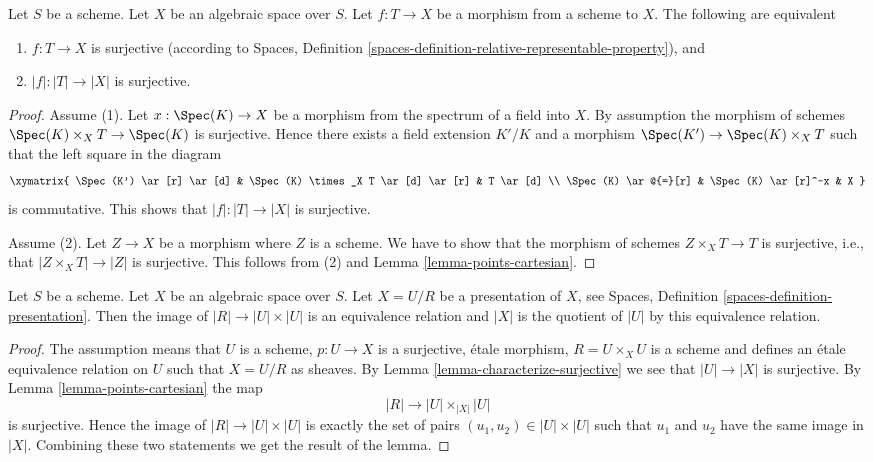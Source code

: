 \begin{lemma}
\label{lemma-characterize-surjective}
Let $S$ be a scheme.
Let $X$ be an algebraic space over $S$.
Let $f : T \to X$ be a morphism from a scheme to $X$.
The following are equivalent
\begin{enumerate}
\item $f : T \to X$ is surjective (according to
Spaces, Definition \ref{spaces-definition-relative-representable-property}),
and
\item $|f| : |T| \to |X|$ is surjective.
\end{enumerate}
\end{lemma}

\begin{proof}
Assume (1). Let $x : \Spec(K) \to X$ be a morphism
from the spectrum of a field into $X$. By assumption the morphism of
schemes $\Spec(K) \times_X T \to \Spec(K)$ is surjective.
Hence there exists a field extension $K'/K$ and a morphism
$\Spec(K') \to \Spec(K) \times_X T$ such that the left
square in the diagram
$$
\xymatrix{
\Spec(K') \ar[r] \ar[d] &
\Spec(K) \times_X T \ar[d] \ar[r] &
T \ar[d] \\
\Spec(K) \ar@{=}[r] &
\Spec(K) \ar[r]^-x & X
}
$$
is commutative. This shows that $|f| : |T| \to |X|$ is surjective.

\medskip\noindent
Assume (2). Let $Z \to X$ be a morphism where $Z$ is
a scheme. We have to show that the morphism of schemes $Z \times_X T \to T$
is surjective, i.e., that $|Z \times_X T| \to |Z|$ is surjective.
This follows from (2) and
Lemma \ref{lemma-points-cartesian}.
\end{proof}

\begin{lemma}
\label{lemma-points-presentation}
Let $S$ be a scheme.
Let $X$ be an algebraic space over $S$.
Let $X = U/R$ be a presentation of $X$, see
Spaces, Definition \ref{spaces-definition-presentation}.
Then the image of $|R| \to |U| \times |U|$ is an equivalence relation
and $|X|$ is the quotient of $|U|$ by this equivalence relation.
\end{lemma}

\begin{proof}
The assumption means that $U$ is a scheme, $p : U \to X$ is a surjective,
\'etale morphism, $R = U \times_X U$ is a scheme and defines an \'etale
equivalence relation on $U$ such that $X = U/R$ as sheaves. By
Lemma \ref{lemma-characterize-surjective}
we see that $|U| \to |X|$ is surjective. By
Lemma \ref{lemma-points-cartesian}
the map
$$
|R| \longrightarrow |U| \times_{|X|} |U|
$$
is surjective. Hence the image of $|R| \to |U| \times |U|$ is
exactly the set of pairs $(u_1, u_2) \in |U| \times |U|$
such that $u_1$ and $u_2$ have the same image in $|X|$.
Combining these two statements we get the result of the lemma.
\end{proof}

